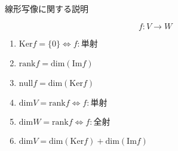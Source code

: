 \documentclass[12pt,b5paper]{ltjsarticle}
\begin{document}
\hrulefill

線形写像に関する説明

\begin{equation}
 f: V \rightarrow W
\end{equation}

\begin{enumerate}
 \item $\mathrm{Ker}f=\{0\} \Leftrightarrow f:\text{単射}$
 \item $\mathrm{rank} f = \mathrm{dim}(\mathrm{Im}f)$
 \item $\mathrm{null}f = \mathrm{dim}(\mathrm{Ker} f)$
 \item $\mathrm{dim} V = \mathrm{rank} f \Leftrightarrow f:\text{単射}$
 \item $\mathrm{dim} W = \mathrm{rank} f \Leftrightarrow f:\text{全射}$
 \item $\mathrm{dim} V = \mathrm{dim}(\mathrm{Ker} f) +  \mathrm{dim}(\mathrm{Im}f)$
\end{enumerate}


\hrulefill
\end{document}
